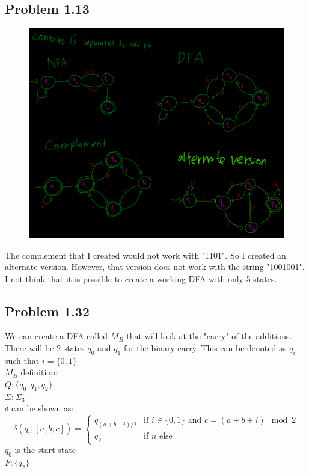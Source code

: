 \documentclass[letter]{article}
\theoremstyle{case}
\begin{document}
\subsection*{Problem 1.13}
\begin{figure}[h!]
	\includegraphics[scale=0.4]{13.png}
\end{figure} 
The complement that I created would not work with "1101". So I created an alternate version. However, that version does not work with the string "1001001". I not think that it is possible to create a working DFA with only 5 states.
\subsection*{Problem 1.32}
We can create a DFA called $M_B$ that will look at the "carry" of the additions. There will be 2 states $q_0$ and $q_1$ for the binary carry. This can be denoted as $q_i$ such that $i = \{0,1\}$ \\
$M_B$ definition: \\
$Q: \{q_0,q_1,q_2\}$ \\
$\Sigma: \Sigma_3$ \\
$\delta$ can be shown as: \\
\[
	\delta(q_i,[a,b,c]) = 
    \begin{cases}
    q_{(a+b+i)/2} &\text{if } i \in \{0,1\} \text{ and } c = (a+b+i) \mod 2 \\
    q_2 &\text{if } n \text{ else}
    \end{cases}
\]
$q_0$ is the start state \\
$F: \{q_2\}$
\newpage
\end{document}
